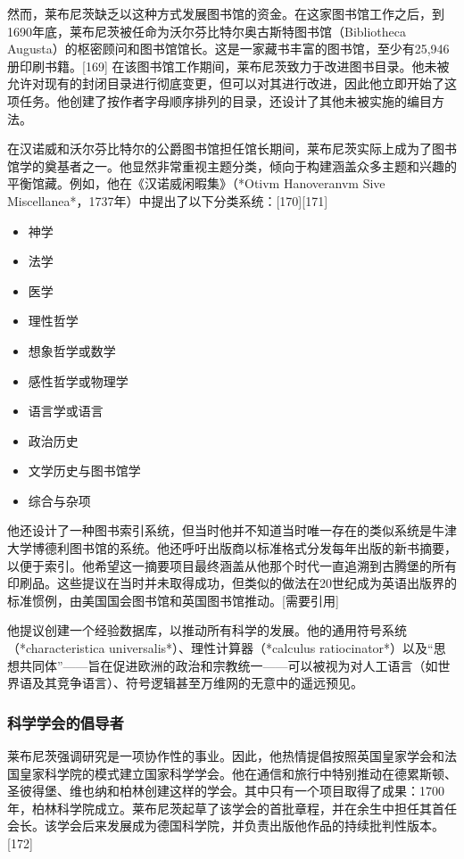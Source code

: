 然而，莱布尼茨缺乏以这种方式发展图书馆的资金。在这家图书馆工作之后，到1690年底，莱布尼茨被任命为沃尔芬比特尔奥古斯特图书馆（Bibliotheca Augusta）的枢密顾问和图书馆馆长。这是一家藏书丰富的图书馆，至少有25,946册印刷书籍。[169] 在该图书馆工作期间，莱布尼茨致力于改进图书目录。他未被允许对现有的封闭目录进行彻底变更，但可以对其进行改进，因此他立即开始了这项任务。他创建了按作者字母顺序排列的目录，还设计了其他未被实施的编目方法。

在汉诺威和沃尔芬比特尔的公爵图书馆担任馆长期间，莱布尼茨实际上成为了图书馆学的奠基者之一。他显然非常重视主题分类，倾向于构建涵盖众多主题和兴趣的平衡馆藏。例如，他在《汉诺威闲暇集》（*Otivm Hanoveranvm Sive Miscellanea*，1737年）中提出了以下分类系统：[170][171]
\begin{itemize}
\item 神学  
\item 法学  
\item 医学 
\item 理性哲学  
\item 想象哲学或数学  
\item 感性哲学或物理学  
\item 语言学或语言  
\item 政治历史  
\item 文学历史与图书馆学  
\item 综合与杂项
\end{itemize}
他还设计了一种图书索引系统，但当时他并不知道当时唯一存在的类似系统是牛津大学博德利图书馆的系统。他还呼吁出版商以标准格式分发每年出版的新书摘要，以便于索引。他希望这一摘要项目最终涵盖从他那个时代一直追溯到古腾堡的所有印刷品。这些提议在当时并未取得成功，但类似的做法在20世纪成为英语出版界的标准惯例，由美国国会图书馆和英国图书馆推动。[需要引用]  

他提议创建一个经验数据库，以推动所有科学的发展。他的通用符号系统（*characteristica universalis*）、理性计算器（*calculus ratiocinator*）以及“思想共同体”——旨在促进欧洲的政治和宗教统一——可以被视为对人工语言（如世界语及其竞争语言）、符号逻辑甚至万维网的无意中的遥远预见。
\subsubsection{科学学会的倡导者}
莱布尼茨强调研究是一项协作性的事业。因此，他热情提倡按照英国皇家学会和法国皇家科学院的模式建立国家科学学会。他在通信和旅行中特别推动在德累斯顿、圣彼得堡、维也纳和柏林创建这样的学会。其中只有一个项目取得了成果：1700年，柏林科学院成立。莱布尼茨起草了该学会的首批章程，并在余生中担任其首任会长。该学会后来发展成为德国科学院，并负责出版他作品的持续批判性版本。[172]
